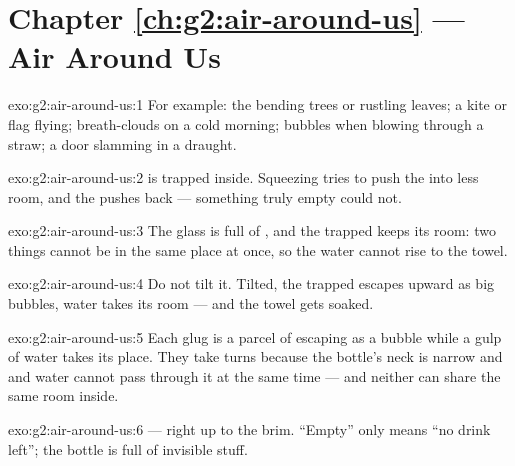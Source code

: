 \section*{Chapter \ref{ch:g2:air-around-us} --- Air Around Us}

\begin{solution}{exo:g2:air-around-us:1}
For example: the  bending trees or rustling leaves; a kite or
flag flying; breath-clouds on a cold morning; bubbles when blowing
through a straw; a door slamming in a draught.
\end{solution}

\begin{solution}{exo:g2:air-around-us:2}
 is trapped inside. Squeezing tries to push the  into less
room, and the  pushes back --- something truly empty could not.
\end{solution}

\begin{solution}{exo:g2:air-around-us:3}
The glass is full of , and the trapped  keeps its room: two
things cannot be in the same place at once, so the water cannot rise
to the towel.
\end{solution}

\begin{solution}{exo:g2:air-around-us:4}
Do not tilt it. Tilted, the trapped  escapes upward as big
bubbles, water takes its room --- and the towel gets soaked.
\end{solution}

\begin{solution}{exo:g2:air-around-us:5}
Each glug is a parcel of  escaping as a bubble while a gulp of
water takes its place. They take turns because the bottle's neck is
narrow and  and water cannot pass through it at the same time ---
and neither can share the same room inside.
\end{solution}

\begin{solution}{exo:g2:air-around-us:6}
 --- right up to the brim. ``Empty'' only means ``no drink left'';
the bottle is full of invisible stuff.
\end{solution}

